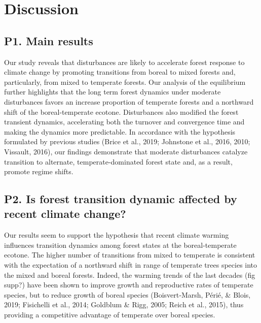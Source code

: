 \documentclass[a4paperpaper,]{article}
\begin{document}
\hypertarget{discussion}{%
\section{Discussion}\label{discussion}}

\hypertarget{p1.-main-results}{%
\subsection{P1. Main results}\label{p1.-main-results}}

Our study reveals that disturbances are likely to accelerate forest
response to climate change by promoting transitions from boreal to mixed
forests and, particularly, from mixed to temperate forests. Our analysis
of the equilibrium further highlights that the long term forest dynamics
under moderate disturbances favors an increase proportion of temperate
forests and a northward shift of the boreal-temperate ecotone.
Disturbances also modified the forest transient dynamics, accelerating
both the turnover and convergence time and making the dynamics more
predictable. In accordance with the hypothesis formulated by previous
studies (Brice et al., 2019; Johnstone et al., 2016, 2010; Vissault,
2016), our findings demonstrate that moderate disturbances catalyze
transition to alternate, temperate-dominated forest state and, as a
result, promote regime shifts.

\hypertarget{p2.-is-forest-transition-dynamic-affected-by-recent-climate-change}{%
\subsection{P2. Is forest transition dynamic affected by recent climate
change?}\label{p2.-is-forest-transition-dynamic-affected-by-recent-climate-change}}

Our results seem to support the hypothesis that recent climate warming
influences transition dynamics among forest states at the
boreal-temperate ecotone. The higher number of transitions from mixed to
temperate is consistent with the expectation of a northward shift in
range of temperate trees species into the mixed and boreal forests.
Indeed, the warming trends of the last decades (fig supp?) have been
shown to improve growth and reproductive rates of temperate species, but
to reduce growth of boreal species (Boisvert‐Marsh, Périé, \& Blois,
2019; Fisichelli et al., 2014; Goldblum \& Rigg, 2005; Reich et al.,
2015), thus providing a competitive advantage of temperate over boreal
species.
\end{document}
